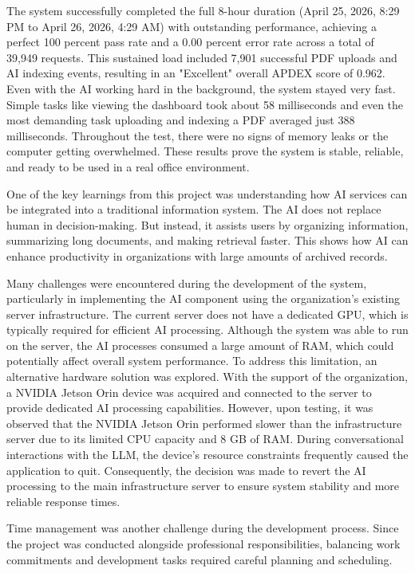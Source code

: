 The system successfully completed the full 8-hour duration (April 25, 2026, 8:29 PM to April 26, 2026, 4:29 AM) with outstanding performance, achieving a perfect 100 percent pass rate and a 0.00 percent error rate across a total of 39,949 requests. This sustained load included 7,901 successful PDF uploads and AI indexing events, resulting in an "Excellent" overall APDEX score of 0.962. Even with the AI working hard in the background, the system stayed very fast. Simple tasks like viewing the dashboard took about 58 milliseconds and even the most demanding task uploading and indexing a PDF averaged just 388 milliseconds. Throughout the test, there were no signs of memory leaks or the computer getting overwhelmed. These results prove the system is stable, reliable, and ready to be used in a real office environment.


One of the key learnings from this project was understanding how AI services can be integrated into a traditional information system. The AI does not replace human in decision-making. But instead, it assists users by organizing information, summarizing long documents, and making retrieval faster. This shows how AI can enhance productivity in organizations with large amounts of archived records.

Many challenges were encountered during the development of the system, particularly in implementing the AI component using the organization’s existing server infrastructure. The current server does not have a dedicated GPU, which is typically required for efficient AI processing. Although the system was able to run on the server, the AI processes consumed a large amount of RAM, which could potentially affect overall system performance. To address this limitation, an alternative hardware solution was explored. With the support of the organization, a NVIDIA Jetson Orin device was acquired and connected to the server to provide dedicated AI processing capabilities. However, upon testing, it was observed that the NVIDIA Jetson Orin performed slower than the infrastructure server due to its limited CPU capacity and 8 GB of RAM. During conversational interactions with the LLM, the device’s resource constraints frequently caused the application to quit. Consequently, the decision was made to revert the AI processing to the main infrastructure server to ensure system stability and more reliable response times.

Time management was another challenge during the development process. Since the project was conducted alongside professional responsibilities, balancing work commitments and development tasks required careful planning and scheduling.

